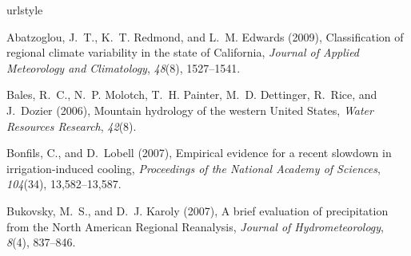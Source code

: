 \documentclass[ms,draft]{agutex}   %
\begin{document}
\begin{article}

%
% 
 







\begin{thebibliography}{84}
\providecommand{\natexlab}[1]{#1}
\expandafter\ifx\csname urlstyle\endcsname\relax
  \providecommand{\doi}[1]{doi:\discretionary{}{}{}#1}\else
  \providecommand{\doi}{doi:\discretionary{}{}{}\begingroup
  \urlstyle{rm}\Url}\fi

Abatzoglou, J.~T., K.~T. Redmond, and L.~M. Edwards (2009), {Classification of
  regional climate variability in the state of California}, \textit{Journal of
  Applied Meteorology and Climatology}, \textit{48}(8), 1527--1541.

Bales, R.~C., N.~P. Molotch, T.~H. Painter, M.~D. Dettinger, R.~Rice, and
  J.~Dozier (2006), {Mountain hydrology of the western United States},
  \textit{Water Resources Research}, \textit{42}(8).

Bonfils, C., and D.~Lobell (2007), Empirical evidence for a recent slowdown in
  irrigation-induced cooling, \textit{Proceedings of the National Academy of
  Sciences}, \textit{104}(34), 13,582--13,587.

Bukovsky, M.~S., and D.~J. Karoly (2007), {A brief evaluation of precipitation
  from the North American Regional Reanalysis}, \textit{Journal of
  Hydrometeorology}, \textit{8}(4), 837--846.


\end{thebibliography}
\end{article}
\end{document}

